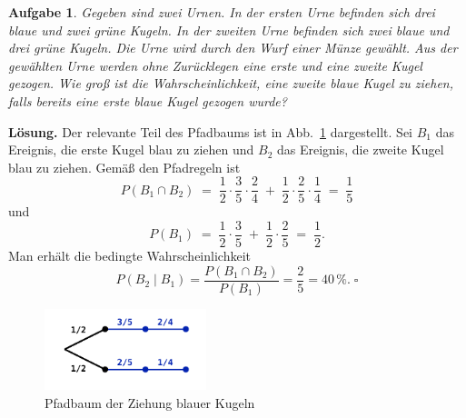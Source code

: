 \documentclass[a4paper,10pt,fleqn,twoside]{scrartcl}
\numberwithin{equation}{section}
\newcommand{\strong}[1]{{\normalfont\sffamily\bfseries #1}}
\renewcommand{\qedsymbol}{\ensuremath{\square}}
\theoremstyle{Aufgabe}
\newtheorem{Aufgabe}{\sffamily Aufgabe}[section]
\begin{document}
\newpage
\begin{Aufgabe}
Gegeben sind zwei Urnen. In der ersten Urne befinden sich drei
blaue und zwei grüne Kugeln. In der zweiten Urne befinden sich
zwei blaue und drei grüne Kugeln. Die Urne wird durch den
Wurf einer Münze gewählt. Aus der gewählten Urne werden ohne Zurücklegen
eine erste und eine zweite Kugel gezogen. Wie groß ist die
Wahrscheinlichkeit, eine zweite blaue Kugel zu ziehen, falls bereits
eine erste blaue Kugel gezogen wurde?
\end{Aufgabe}
\strong{Lösung.} Der relevante
Teil des Pfadbaums ist in Abb.~\ref{fig:Pfadbaum-zwei-Urnen} dargestellt.
Sei $B_1$ das Ereignis, die erste Kugel blau zu ziehen und
$B_2$ das Ereignis, die zweite Kugel blau zu ziehen. Gemäß den
Pfadregeln ist
\[P(B_1\cap B_2)\;=\; \frac{1}{2}\cdot\frac{3}{5}\cdot\frac{2}{4}
\;+\; \frac{1}{2}\cdot\frac{2}{5}\cdot\frac{1}{4} \;=\; \frac{1}{5}\]
und
\[P(B_1) \;=\; \frac{1}{2}\cdot\frac{3}{5}\;+\;\frac{1}{2}\cdot\frac{2}{5}
\;=\; \frac{1}{2}.\]
Man erhält die bedingte Wahrscheinlichkeit
\[P(B_2\mid B_1) = \frac{P(B_1\cap B_2)}{P(B_1)} = \frac{2}{5} = 40\,\%.\;\qedsymbol\]

\begin{figure}[b]
\begin{center}
\includegraphics[width=0.42\textwidth]{img/Zwei-Urnen.pdf}
\end{center}
\caption{Pfadbaum der Ziehung blauer Kugeln}
\label{fig:Pfadbaum-zwei-Urnen}
\end{figure}

\newpage
\end{document}
